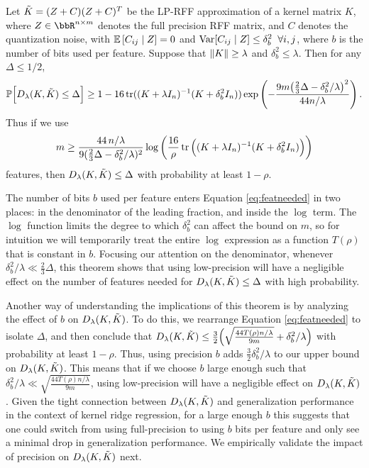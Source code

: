 \begin{theorem}
	\label{thm2}
	Let $\tilde{K} = (Z+C)(Z+C)^T$ be the LP-RFF approximation of a kernel matrix $K$, where $Z\in\RR^{n\times m}$ denotes the full precision RFF matrix, and $C$ denotes the quantization noise, with $\expect{}{C_{ij} \mid Z} = 0$ and ${\rm Var}[C_{ij} \mid Z] \leq \delta_b^2 \;\;\forall i,j$, where $b$ is the number of bits used per feature. Suppose that $\|K\| \geq \lambda$ and $\delta^2_b \leq \lambda$. Then for any $\Delta \leq 1/2$,
	\begin{equation*}
	\mathbb{P}\Big[D_{\lambda}(K,\tilde{K}) \leq \Delta\Big] \geq 1 - 16 \mathop{\rm tr}((K + \lambda I_n)^{-1} (K + \delta^2_b I_n)) \exp \left( -\frac{9m \big(\frac{2}{3}\Delta - \delta^2_b / \lambda\big)^2}{44n/\lambda} \right).
	\end{equation*}
	Thus if we use 
	\begin{equation}
	\label{eq:featneeded}
	m \geq \frac{44\, n/\lambda}{9(\frac{2}{3}\Delta - \delta_b^2/\lambda)^{2}} \log \bigg(\frac{16}{\rho} \mathop{\rm tr}\Big((K + \lambda I_n)^{-1} (K + \delta^2_b I_n)\Big) \bigg)
	\end{equation}
	features, then $D_\lambda(K,\tilde{K})\leq \Delta$  with probability at least $1 - \rho$.
\end{theorem}

The number of bits $b$ used per feature enters Equation \ref{eq:featneeded} in two places: in the denominator of the leading fraction, and inside the $\log$ term. The $\log$ function limits the degree to which $\delta_b^2$ can affect the bound on $m$, so for intuition we will temporarily treat the entire $\log$ expression as a function $T(\rho)$ that is constant in $b$. Focusing our attention on the denominator, whenever $\delta_b^2/\lambda \ll \frac{2}{3}\Delta$, this theorem shows that using low-precision will have a negligible effect on the number of features needed for $D_{\lambda}(K,\tilde{K}) \leq \Delta$ with high probability.

Another way of understanding the implications of this theorem is by analyzing the effect of $b$ on $D_{\lambda}(K,\tilde{K})$. To do this, we rearrange Equation \ref{eq:featneeded} to isolate $\Delta$, and then conclude that $D_{\lambda}(K,\tilde{K}) \leq \frac{3}{2} \Big(\sqrt{\frac{44T(\rho)n/\lambda}{9m}} + \delta_b^2/\lambda\Big)$ with probability at least $1-\rho$.  Thus, using precision $b$ adds $\frac{3}{2}\delta_b^2/\lambda$ to our upper bound on $D_{\lambda}(K,\tilde{K})$.  This means that if we choose $b$ large enough such that $\delta_b^2/\lambda \ll \sqrt{\frac{44T(\rho)n/\lambda}{9m}}$, using low-precision will have a negligible effect on $D_{\lambda}(K,\tilde{K})$. Given the tight connection between $D_{\lambda}(K,\tilde{K})$ and generalization performance in the context of kernel ridge regression, for a large enough $b$ this suggests that one could switch from using full-precision to using $b$ bits per feature and only see a minimal drop in generalization performance.  We empirically validate the impact of precision on $D_{\lambda}(K,\tilde{K})$ next.
\vsp

